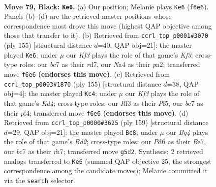 \documentclass[11pt]{article}
\begin{document}
\clearpage

\begin{figure}[p]\centering
\begin{subfigure}{0.46\textwidth}\centering
\resizebox{\linewidth}{!}{%
\newchessgame
\chessboard[
  setfen={8/2B5/3p1k1p/4p1b1/n1K1P2p/5r2/7R/8 b - - 1 79},
  showmover=false,
  pgfstyle=straightmove, color=movearrow, markmove={f6-e6}
]}
\caption{}
\end{subfigure}\hfill
\begin{subfigure}{0.46\textwidth}\centering
\resizebox{\linewidth}{!}{%
\newchessgame
\chessboard[
  setfen={8/3R4/3p1kpP/4b3/K1P2p2/8/P7/8 b - - 1 78},
  showmover=false,
  pgfstyle=straightmove, color=movearrow, markmove={f6-e6}
]}
\caption{}
\end{subfigure}
\\[4pt]
\begin{subfigure}{0.46\textwidth}\centering
\resizebox{\linewidth}{!}{%
\newchessgame
\chessboard[
  setfen={8/R5p1/7p/2pk1p1P/3b1P2/6P1/4K3/8 b - - 6 78},
  showmover=false,
  pgfstyle=straightmove, color=movearrow, markmove={d5-c4}
]}
\caption{}
\end{subfigure}\hfill
\begin{subfigure}{0.46\textwidth}\centering
\resizebox{\linewidth}{!}{%
\newchessgame
\chessboard[
  setfen={4k3/3bb2R/4p3/1p1pK3/8/1P6/8/4B3 b - - 41 80},
  showmover=false,
  pgfstyle=straightmove, color=movearrow, markmove={d7-c8}
]}
\caption{}
\end{subfigure}
\caption{\textbf{Move 79, Black: \texttt{Ke6}.} (a) Our position; Melanie plays \texttt{Ke6} (\texttt{f6e6}). Panels (b)--(d) are the retrieved master positions whose correspondence most drove this move (highest QAP objective among those that transfer to it). (b) Retrieved from \texttt{ccrl\_top\_p0001\#3070} (ply 155) [structural distance $d$=40, QAP obj=21]: the master played \texttt{Ke6}; under $\mu$ our \emph{Kf3} plays the role of that game's \emph{Kf3}; cross-type roles: our \emph{b}c7 as their \emph{r}d7, our \emph{N}a4 as their \emph{p}a2; transferred move \texttt{f6e6} \textbf{(endorses this move)}. (c) Retrieved from \texttt{ccrl\_top\_p0003\#1870} (ply 155) [structural distance $d$=38, QAP obj=4]: the master played \texttt{Kc4}; under $\mu$ our \emph{Kf3} plays the role of that game's \emph{Kd4}; cross-type roles: our \emph{R}f3 as their \emph{P}f5, our \emph{b}c7 as their \emph{p}f4; transferred move \texttt{f6e6} \textbf{(endorses this move)}. (d) Retrieved from \texttt{ccrl\_top\_p0000\#3625} (ply 159) [structural distance $d$=29, QAP obj=21]: the master played \texttt{Bc8}; under $\mu$ our \emph{Bg4} plays the role of that game's \emph{Bd2}; cross-type roles: our \emph{P}d6 as their \emph{B}e7, our \emph{b}c7 as their \emph{r}h7; transferred move \texttt{g5d2}. Synthesis: 2 retrieved analogs transferred to \texttt{Ke6} (summed QAP objective 25, the strongest correspondence among the candidate moves); Melanie committed it via the \texttt{search} selector.}
\label{fig:thought-m157}
\end{figure}
\end{document}
